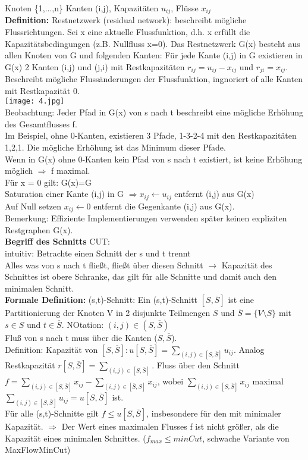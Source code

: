 \documentclass[a4paper]{article}
\begin{document}
Knoten \{1,...,n\} Kanten (i,j), Kapazitäten $u_{ij}$, Flüsse $x_{ij}$\\
\textbf{Definition:} Restnetzwerk (residual network): beschreibt mögliche Flussrichtungen. Sei x eine aktuelle Flussfunktion, d.h. x erfüllt die Kapazitätsbedingungen (z.B. Nullfluss x=0). Das Restnetzwerk G(x) besteht aus allen Knoten von G und folgenden Kanten: Für jede Kante (i,j) in G existieren in G(x) 2 Kanten (i,j) und (j,i) mit Restkapazitäten $r_{ij} = u_{ij} - x_{ij}$ und  $r_{ji} = x_{ij}$. Beschreibt mögliche Flussänderungen der Flussfunktion, ingnoriert of alle Kanten mit Restkapazität 0.\\
\texttt{[image: 4.jpg]}\\
Beobachtung: Jeder Pfad in G(x) von s nach t beschreibt eine mögliche Erhöhung des Gesamtflusses f.\\
Im Beispiel, ohne 0-Kanten, existieren 3 Pfade, 1-3-2-4 mit den Restkapazitäten 1,2,1. Die mögliche Erhöhung ist das Minimum dieser Pfade.\\
Wenn in G(x) ohne 0-Kanten kein Pfad von s nach t existiert, ist keine Erhöhung möglich $\Rightarrow$ f maximal.\\
Für x = 0 gilt: G(x)=G\\
Saturation einer Kante (i,j) in G $\Rightarrow x_{ij}\leftarrow u_{ij}$ entfernt (i,j) aus G(x)\\
Auf Null setzen $x_{ij}\leftarrow 0$ entfernt die Gegenkante (i,j) aus G(x).\\
Bemerkung: Effiziente Implementierungen verwenden später keinen expliziten Restgraphen G(x).\\
\textbf{Begriff des Schnitts} CUT:\\
intuitiv: Betrachte einen Schnitt der s und t trennt\\
Alles was von s nach t fließt, fließt über diesen Schnitt $\rightarrow$ Kapazität des Schnittes ist obere Schranke, das gilt für alle Schnitte und damit auch den minimalen Schnitt.\\
\textbf{Formale Definition:} (s,t)-Schnitt: Ein (s,t)-Schnitt $[S,\overline{S}]$ ist eine Partitionierung der Knoten V in 2 disjunkte Teilmengen $S$ und $\overline{S}=\{V\setminus S\}$ mit $s\in S$ und $t\in \overline{S}$. NOtation: $(i,j)\in (S,\overline{S})$\\
Fluß von s nach t muss über die Kanten ($S,\overline{S}$). \\
Definition: Kapazität von $[S,\overline{S}]: u[S,\overline{S}] = \sum_{(i,j)\in [S,\overline{S}]} u_{ij}$. Analog Restkapazität $r[S,\overline{S}]=\sum_{(i,j)\in [S,\overline{S}]}$. Fluss über den Schnitt $f=\sum_{(i,j)\in [S,\overline{S}]}x_{ij} -\sum_{(i,j)\in [\overline{S},S]}x_{ij}$, wobei $\sum_{(i,j)\in [S,\overline{S}]}x_{ij}$ maximal $\sum_{(i,j)\in [S,\overline{S}]}u_{ij}=u[S,\overline{S}]$ ist.\\
Für alle (s,t)-Schnitte gilt $f\leq u[S,\overline{S}]$, insbesondere für den mit minimaler Kapazität. $\Rightarrow$ Der Wert eines maximalen Flusses f ist nicht größer, als die Kapazität eines minimalen Schnittes. ($f_{max}\leq minCut$, schwache Variante von MaxFlowMinCut)\\
\end{document}
